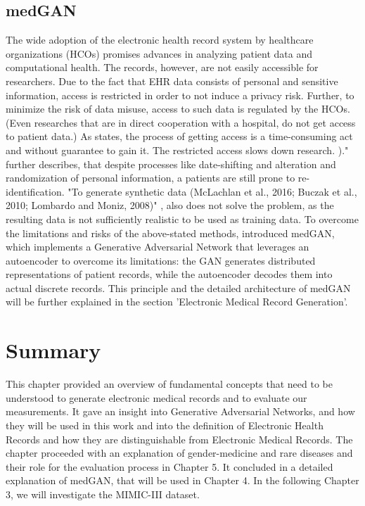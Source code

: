 \documentclass[11pt, a4paper, oneside]{book}
\begin{document}
\subsection{medGAN}
The wide adoption of the electronic health record system by healthcare organizations (HCOs) promises advances in analyzing patient data and computational health. The records, however, are not easily accessible for researchers. Due to the fact that EHR data consists of personal and sensitive information, access is restricted in order to not induce a privacy risk. Further, to minimize the risk of data misuse, access to such data is regulated by the HCOs. \citep{Choi2017}
(Even researches that are in direct cooperation with a hospital, do not get access to patient data.)
 As \citep{Choi2017} states, the process of getting access is a time-consuming act and without guarantee to gain it. The restricted access slows down research. )." \citep{Choi2017} further describes, that despite processes like date-shifting and alteration and randomization of personal  information, a patients are still prone to re-identification. "To generate synthetic data (McLachlan et al., 2016; Buczak et al., 2010; Lombardo and Moniz, 2008)" \citep{Choi2017}, also does not solve the problem, as the resulting data is not sufficiently realistic to be used as training data.
 To overcome the limitations and risks of the above-stated methods, \citep{Choi2017} introduced medGAN, which implements a Generative Adversarial Network that leverages an autoencoder to overcome its limitations: the GAN generates distributed representations of patient records, while the autoencoder decodes them into actual discrete records.
 This principle and the detailed architecture of medGAN will be further explained in the section 'Electronic Medical Record Generation'.

\section{Summary}
This chapter provided an overview of fundamental concepts that need to be understood to generate electronic medical records and to evaluate our measurements.
It gave an insight into Generative Adversarial Networks, and how they will be used in this work and into the definition of Electronic Health Records and how they are distinguishable from Electronic Medical Records.
The chapter proceeded with an explanation of gender-medicine and rare diseases and their role for the evaluation process in Chapter 5. It concluded in a detailed explanation of medGAN, that will be used in Chapter 4. In the following Chapter 3, we will investigate the MIMIC-III dataset.
\end{document}
